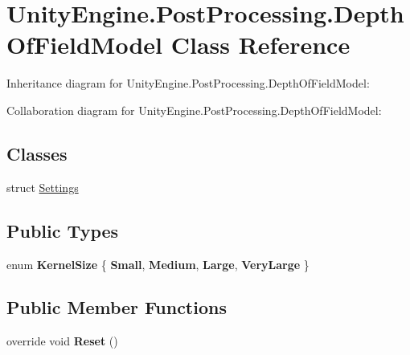\hypertarget{class_unity_engine_1_1_post_processing_1_1_depth_of_field_model}{}\section{Unity\+Engine.\+Post\+Processing.\+Depth\+Of\+Field\+Model Class Reference}
\label{class_unity_engine_1_1_post_processing_1_1_depth_of_field_model}


Inheritance diagram for Unity\+Engine.\+Post\+Processing.\+Depth\+Of\+Field\+Model\+:


Collaboration diagram for Unity\+Engine.\+Post\+Processing.\+Depth\+Of\+Field\+Model\+:
\subsection*{Classes}
\begin{DoxyCompactItemize}
\item 
struct \hyperlink{struct_unity_engine_1_1_post_processing_1_1_depth_of_field_model_1_1_settings}{Settings}
\end{DoxyCompactItemize}
\subsection*{Public Types}
\begin{DoxyCompactItemize}
\item 
\mbox{\label{class_unity_engine_1_1_post_processing_1_1_depth_of_field_model_a8b92e9c86b4ffe225306853f8bfd4015}} 
enum {\bfseries Kernel\+Size} \{ {\bfseries Small}, 
{\bfseries Medium}, 
{\bfseries Large}, 
{\bfseries Very\+Large}
 \}
\end{DoxyCompactItemize}
\subsection*{Public Member Functions}
\begin{DoxyCompactItemize}
\item 
\mbox{\label{class_unity_engine_1_1_post_processing_1_1_depth_of_field_model_aed85b9c87b7fd8c5844d44ff7883309c}} 
override void {\bfseries Reset} ()
\end{DoxyCompactItemize}

